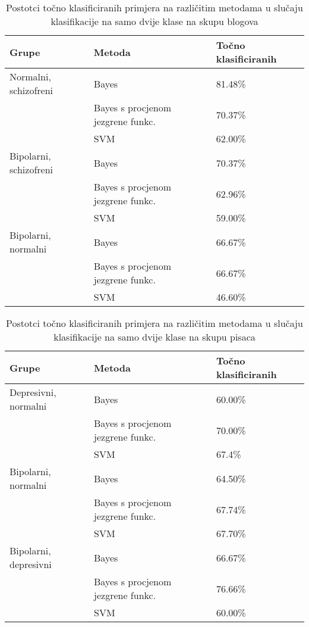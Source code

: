 \documentclass[10pt, a4paper]{article}
\begin{document}
\begin{table*}
\caption{Postotci točno klasificiranih primjera na različitim metodama u slučaju klasifikacije na samo dvije klase na skupu blogova}
\label{lab:rezultatiBlogGrupa}
\begin{center}
\begin{tabular}{lll}
\toprule
Grupe & Metoda & Točno klasificiranih\\
\midrule
Normalni, schizofreni & Bayes & 81.48\%\\
 & Bayes s procjenom jezgrene funkc. & 70.37\%\\
 & SVM & 62.00\%\\
Bipolarni, schizofreni & Bayes & 70.37\%\\
 & Bayes s procjenom jezgrene funkc. & 62.96\%\\
 & SVM & 59.00\%\\
Bipolarni, normalni & Bayes & 66.67\%\\
 & Bayes s procjenom jezgrene funkc. & 66.67\%\\
 & SVM & 46.60\%\\
 \bottomrule
 \end{tabular}
 \end{center}
 \end{table*}
\begin{table*}
\caption{Postotci točno klasificiranih primjera na različitim metodama u slučaju klasifikacije na samo dvije klase na skupu pisaca}
\label{tab:rezultPisciGrupa}
\begin{center}
\begin{tabular}{lll}
\toprule
Grupe & Metoda & Točno klasificiranih\\
\midrule
Depresivni, normalni & Bayes & 60.00\%\\
 & Bayes s procjenom jezgrene funkc. & 70.00\%\\
 & SVM & 67.4\%\\
Bipolarni, normalni & Bayes & 64.50\%\\
 & Bayes s procjenom jezgrene funkc. & 67.74\%\\
 & SVM & 67.70\%\\
Bipolarni, depresivni & Bayes & 66.67\%\\
 & Bayes s procjenom jezgrene funkc. & 76.66\%\\
  & SVM & 60.00\%\\
\bottomrule
\end{tabular}
\end{center}
\end{table*}
\end{document}
